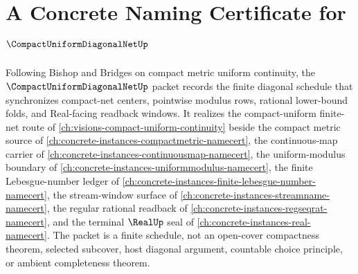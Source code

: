 \chapter{A Concrete Naming Certificate for $\CompactUniformDiagonalNetUp$}
\label{ch:concrete-instances-compact-uniform-diagonal-net-namecert}

Following Bishop and Bridges on compact metric uniform continuity, the $\CompactUniformDiagonalNetUp$ packet records the finite diagonal schedule that synchronizes compact-net centers, pointwise modulus rows, rational lower-bound folds, and Real-facing readback windows. It realizes the compact-uniform finite-net route of \autoref{ch:visions-compact-uniform-continuity} beside the compact metric source of \autoref{ch:concrete-instances-compactmetric-namecert}, the continuous-map carrier of \autoref{ch:concrete-instances-continuousmap-namecert}, the uniform-modulus boundary of \autoref{ch:concrete-instances-uniformmodulus-namecert}, the finite Lebesgue-number ledger of \autoref{ch:concrete-instances-finite-lebesgue-number-namecert}, the stream-window surface of \autoref{ch:concrete-instances-streamname-namecert}, the regular rational readback of \autoref{ch:concrete-instances-regseqrat-namecert}, and the terminal $\RealUp$ seal of \autoref{ch:concrete-instances-real-namecert}. The packet is a finite schedule, not an open-cover compactness theorem, selected subcover, host diagonal argument, countable choice principle, or ambient completeness theorem.

